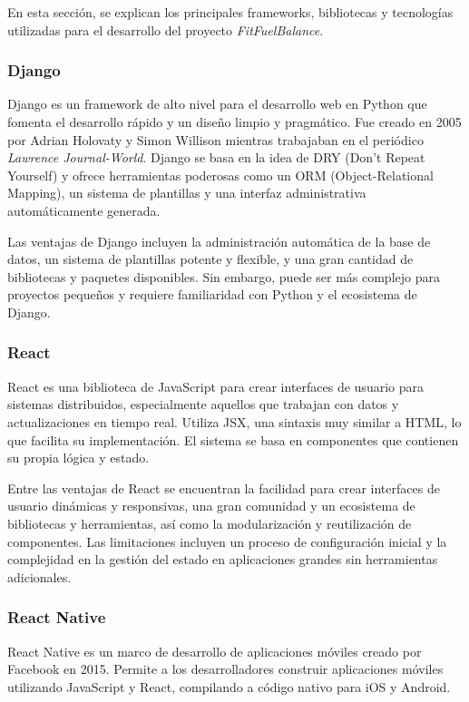 En esta sección, se explican los principales frameworks, bibliotecas y tecnologías utilizadas para el desarrollo del proyecto \textit{FitFuelBalance}.

\subsubsection{Django}

Django es un framework de alto nivel para el desarrollo web en Python que fomenta el desarrollo rápido y un diseño limpio y pragmático. Fue creado en 2005 por Adrian Holovaty y Simon Willison mientras trabajaban en el periódico \textit{Lawrence Journal-World}. Django se basa en la idea de DRY (Don’t Repeat Yourself) y ofrece herramientas poderosas como un ORM (Object-Relational Mapping), un sistema de plantillas y una interfaz administrativa automáticamente generada\cite{Django}.

Las ventajas de Django incluyen la administración automática de la base de datos, un sistema de plantillas potente y flexible, y una gran cantidad de bibliotecas y paquetes disponibles. Sin embargo, puede ser más complejo para proyectos pequeños y requiere familiaridad con Python y el ecosistema de Django.

\subsubsection{React}

React es una biblioteca de JavaScript para crear interfaces de usuario para sistemas distribuidos, especialmente aquellos que trabajan con datos y actualizaciones en tiempo real. Utiliza JSX, una sintaxis muy similar a HTML, lo que facilita su implementación. El sistema se basa en componentes que contienen su propia lógica y estado\cite{React}.

Entre las ventajas de React se encuentran la facilidad para crear interfaces de usuario dinámicas y responsivas, una gran comunidad y un ecosistema de bibliotecas y herramientas, así como la modularización y reutilización de componentes. Las limitaciones incluyen un proceso de configuración inicial y la complejidad en la gestión del estado en aplicaciones grandes sin herramientas adicionales.

\subsubsection{React Native}

React Native es un marco de desarrollo de aplicaciones móviles creado por Facebook en 2015. Permite a los desarrolladores construir aplicaciones móviles utilizando JavaScript y React, compilando a código nativo para iOS y Android\cite{ReactNative}.

